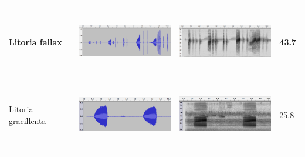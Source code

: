 \begin{table}[htb!]
\begin{tabular}{llll}
Litoria fallax      &      \begin{minipage}{.3\textwidth} \includegraphics[width=45mm, height=30mm]{image/fallax_wav.png} \end{minipage}   &   \begin{minipage}{.3\textwidth} \includegraphics[width=45mm, height=30mm]{image/fallax_spec.png}   \end{minipage}       & 43.7  \\ \hline
Litoria gracillenta &     \begin{minipage}{.3\textwidth} \includegraphics[width=45mm, height=30mm]{image/graci_wav.png}  \end{minipage}   &    \begin{minipage}{.3\textwidth} \includegraphics[width=45mm, height=30mm]{image/graci_spec.png}     \end{minipage}    & 25.8  \\ \hline

\end{tabular}
\end{table}
